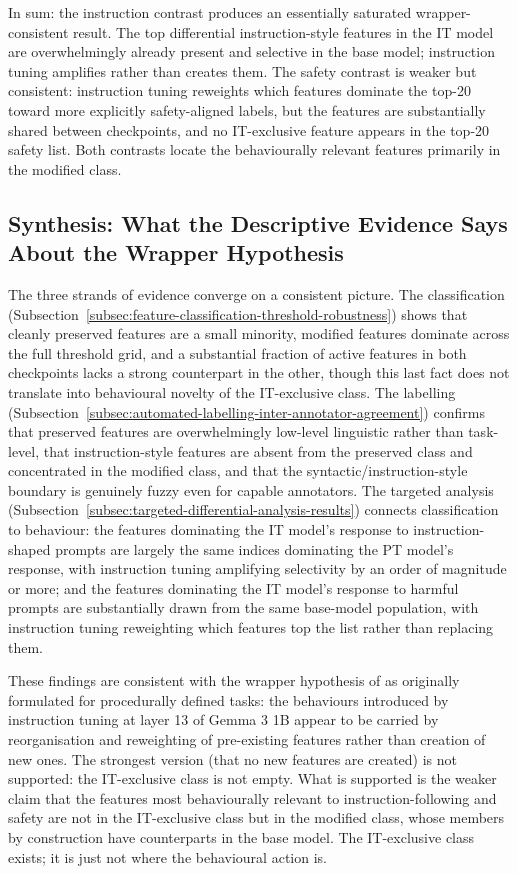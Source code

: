 In sum: the instruction contrast produces an essentially saturated wrapper-consistent result. The top differential instruction-style features in the IT model are overwhelmingly already present and selective in the base model; instruction tuning amplifies rather than creates them. The safety contrast is weaker but consistent: instruction tuning reweights which features dominate the top-20 toward more explicitly safety-aligned labels, but the features are substantially shared between checkpoints, and no IT-exclusive feature appears in the top-20 safety list. Both contrasts locate the behaviourally relevant features primarily in the modified class.

\subsection{Synthesis: What the Descriptive Evidence Says About the Wrapper Hypothesis}
\label{subsec:results-synthesis-wrapper-hypothesis}

The three strands of evidence converge on a consistent picture. The classification (Subsection~\ref{subsec:feature-classification-threshold-robustness}) shows that cleanly preserved features are a small minority, modified features dominate across the full threshold grid, and a substantial fraction of active features in both checkpoints lacks a strong counterpart in the other, though this last fact does not translate into behavioural novelty of the IT-exclusive class. The labelling (Subsection~\ref{subsec:automated-labelling-inter-annotator-agreement}) confirms that preserved features are overwhelmingly low-level linguistic rather than task-level, that instruction-style features are absent from the preserved class and concentrated in the modified class, and that the syntactic/instruction-style boundary is genuinely fuzzy even for capable annotators. The targeted analysis (Subsection~\ref{subsec:targeted-differential-analysis-results}) connects classification to behaviour: the features dominating the IT model's response to instruction-shaped prompts are largely the same indices dominating the PT model's response, with instruction tuning amplifying selectivity by an order of magnitude or more; and the features dominating the IT model's response to harmful prompts are substantially drawn from the same base-model population, with instruction tuning reweighting which features top the list rather than replacing them.

These findings are consistent with the wrapper hypothesis of \textcite{jain_mechanistically_2024} as originally formulated for procedurally defined tasks: the behaviours introduced by instruction tuning at layer 13 of Gemma 3 1B appear to be carried by reorganisation and reweighting of pre-existing features rather than creation of new ones. The strongest version (that no new features are created) is not supported: the IT-exclusive class is not empty. What is supported is the weaker claim that the features most behaviourally relevant to instruction-following and safety are not in the IT-exclusive class but in the modified class, whose members by construction have counterparts in the base model. The IT-exclusive class exists; it is just not where the behavioural action is.

